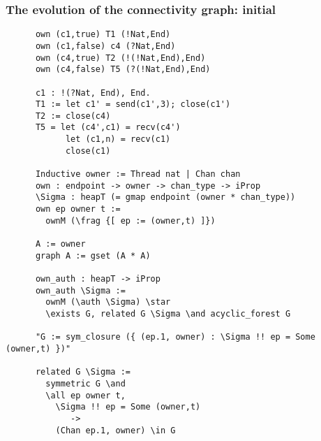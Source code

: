 \documentclass[aspectratio=169]{beamer}
\begin{document}
\begin{frame}[fragile]
  \frametitle{The evolution of the connectivity graph: initial}

    \begin{verbatim}
      own (c1,true) T1 (!Nat,End)
      own (c1,false) c4 (?Nat,End)
      own (c4,true) T2 (!(!Nat,End),End)
      own (c4,false) T5 (?(!Nat,End),End)

      c1 : !(?Nat, End), End.
      T1 := let c1' = send(c1',3); close(c1')
      T2 := close(c4)
      T5 = let (c4',c1) = recv(c4')
            let (c1,n) = recv(c1)
            close(c1)

      Inductive owner := Thread nat | Chan chan
      own : endpoint -> owner -> chan_type -> iProp
      \Sigma : heapT (= gmap endpoint (owner * chan_type))
      own ep owner t :=
        ownM (\frag {[ ep := (owner,t) ]})

      A := owner
      graph A := gset (A * A)

      own_auth : heapT -> iProp
      own_auth \Sigma :=
        ownM (\auth \Sigma) \star
        \exists G, related G \Sigma \and acyclic_forest G

      "G := sym_closure ({ (ep.1, owner) : \Sigma !! ep = Some (owner,t) })"

      related G \Sigma :=
        symmetric G \and
        \all ep owner t,
          \Sigma !! ep = Some (owner,t)
             ->
          (Chan ep.1, owner) \in G

    \end{verbatim}
\end{frame}
\end{document}
